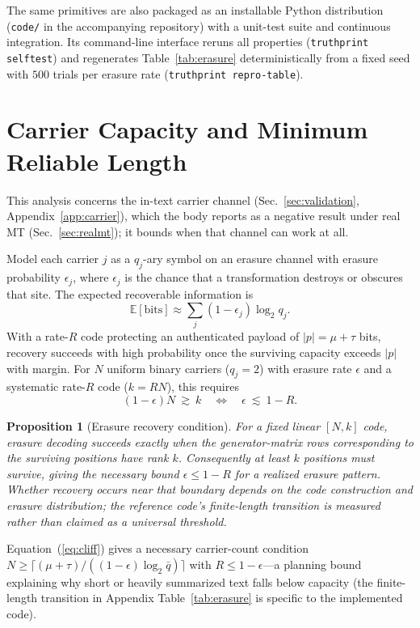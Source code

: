 \documentclass[journal]{IEEEtran}
\newtheorem{proposition}{Proposition}
\begin{document}
The same primitives are also packaged as an installable Python distribution (\texttt{code/} in the accompanying repository) with a unit-test suite and continuous integration. Its command-line interface reruns all properties (\texttt{truthprint selftest}) and regenerates Table~\ref{tab:erasure} deterministically from a fixed seed with $500$ trials per erasure rate (\texttt{truthprint repro-table}).

\section{Carrier Capacity and Minimum Reliable Length}
\label{app:capacity}
This analysis concerns the in-text carrier channel (Sec.~\ref{sec:validation}, Appendix~\ref{app:carrier}), which the body reports as a negative result under real MT (Sec.~\ref{sec:realmt}); it bounds when that channel can work at all.

Model each carrier $j$ as a $q_j$-ary symbol on an erasure channel with erasure probability $\epsilon_j$, where $\epsilon_j$ is the chance that a transformation destroys or obscures that site. The expected recoverable information is
\begin{equation}
\mathbb{E}[\text{bits}]\approx\sum_j (1-\epsilon_j)\log_2 q_j .
\end{equation}
With a rate-$R$ code protecting an authenticated payload of $|p|=\mu+\tau$ bits, recovery succeeds with high probability once the surviving capacity exceeds $|p|$ with margin. For $N$ uniform binary carriers ($q_j=2$) with erasure rate $\epsilon$ and a systematic rate-$R$ code ($k=RN$), this requires
\begin{equation}
(1-\epsilon)N \ \gtrsim\ k \quad\Longleftrightarrow\quad \epsilon \ \lesssim\ 1-R .
\label{eq:cliff}
\end{equation}
\begin{proposition}[Erasure recovery condition]
\label{prop:cliff}
For a fixed linear $[N,k]$ code, erasure decoding succeeds exactly when the
generator-matrix rows corresponding to the surviving positions have rank $k$.
Consequently at least $k$ positions must survive, giving the necessary bound
$\epsilon\leq 1-R$ for a realized erasure pattern.  Whether recovery occurs
near that boundary depends on the code construction and erasure distribution;
the reference code's finite-length transition is measured rather than claimed
as a universal threshold.
\end{proposition}
Equation~(\ref{eq:cliff}) gives a necessary carrier-count condition $N\geq\lceil(\mu+\tau)/((1-\epsilon)\log_2\bar q)\rceil$ with $R\leq1-\epsilon$---a planning bound explaining why short or heavily summarized text falls below capacity (the finite-length transition in Appendix Table~\ref{tab:erasure} is specific to the implemented code).
\end{document}
